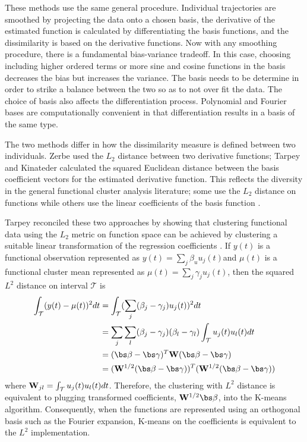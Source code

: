 These methods use the same general procedure. Individual trajectories are smoothed by projecting the data onto a chosen basis, the derivative of the estimated function is calculated by differentiating the basis functions, and the dissimilarity is based on the derivative functions. Now with any smoothing procedure, there is a fundamental bias-variance tradeoff. In this case, choosing including higher ordered terms or more sine and cosine functions in the basis decreases the bias but increases the variance. The basis needs to be determine in order to strike a balance between the two so as to not over fit the data. The choice of basis also affects the differentiation process. Polynomial and Fourier bases are computationally convenient in that differentiation results in a basis of the same type.

 The two methods differ in how the dissimilarity measure is defined between two individuals. Zerbe used the $L_{2}$ distance between two derivative functions; Tarpey and Kinateder calculated the squared Euclidean distance between the basis coefficient vectors for the estimated derivative function. This reflects the diversity in the general functional cluster analysis literature; some use the $L_{2}$ distance on functions \cite{hitchcock2007} while others use the linear coefficients of the basis function \cite{serban2005, tarpey2003, abraham2003}.
 
Tarpey reconciled these two approaches by showing that clustering functional data using the $L_{2}$ metric on function space can be achieved by clustering a suitable linear transformation of the regression coefficients \cite{tarpey2007}. If $y(t)$ is a functional observation represented as $y(t)=\sum_{j}\beta_{u}u_{j}(t)$and $\mu(t)$ is a functional cluster mean represented as $\mu(t) = \sum_{j}\gamma_{j}u_{j}(t)$, then the squared $L^{2}$ distance on interval $\mathcal{T}$ is
\begin{align*}
\int_{\mathcal{T}}(y(t)-\mu(t))^{2}dt &= \int_{\mathcal{T}}(\sum_{j}(\beta_{j}-\gamma_{j})u_{j}(t))^{2}dt\\
&= \sum_{j}\sum_{l}(\beta_{j}-\gamma_{j})(\beta_{l}-\gamma_{l}) \int_{\mathcal{T}}u_{j}(t)u_{l}(t)dt\\
&=(\bs\beta-\bs\gamma)^{T}\B W (\bs\beta-\bs\gamma)\\
&=(\B W^{1/2}(\bs\beta-\bs\gamma))^{T} (\B W^{1/2}(\bs\beta-\bs\gamma))
\end{align*}
where $\mathbf W_{jl} = \int_{\mathcal{T}}u_{j}(t)u_{l}(t)dt$. Therefore, the clustering with $L^{2}$ distance is equivalent to plugging transformed coefficients, $\B W^{1/2}\bs\beta$, into the K-means algorithm. Consequently, when the functions are represented using an orthogonal basis such as the Fourier expansion, K-means on the coefficients is equivalent to the $L^{2}$ implementation.\\

